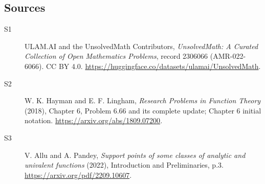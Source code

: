 \documentclass[11pt]{article}
\begin{document}
\subsection{Sources}
\begin{description}
\item[\hypertarget{source:2306066:1}{S1}] ULAM.AI and the UnsolvedMath Contributors, \emph{UnsolvedMath: A Curated Collection of Open Mathematics Problems}, record 2306066 (AMR-022-6066). CC BY 4.0. \url{https://huggingface.co/datasets/ulamai/UnsolvedMath}.
\item[\hypertarget{source:2306066:2}{S2}] W. K. Hayman and E. F. Lingham, \emph{Research Problems in Function Theory} (2018), Chapter 6, Problem 6.66 and its complete update; Chapter 6 initial notation. \url{https://arxiv.org/abs/1809.07200}.
\item[\hypertarget{source:2306066:3}{S3}] V. Allu and A. Pandey, \emph{Support points of some classes of analytic and univalent functions} (2022), Introduction and Preliminaries, p.3. \url{https://arxiv.org/pdf/2209.10607}.
\end{description}
\label{end:2306066}
\end{document}

